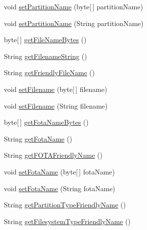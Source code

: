 \begin{DoxyCompactItemize}
void \hyperlink{class_c_a_s_u_a_l_1_1archiving_1_1libpit_1_1_pit_entry_ad8aabdd2d4ed27f78caff057a86463a5}{set\-Partition\-Name} (byte\mbox{[}$\,$\mbox{]} partition\-Name)
\item 
void \hyperlink{class_c_a_s_u_a_l_1_1archiving_1_1libpit_1_1_pit_entry_ae11c9323f73814e25d10d9ef29de25ba}{set\-Partition\-Name} (String partition\-Name)
\item 
byte\mbox{[}$\,$\mbox{]} \hyperlink{class_c_a_s_u_a_l_1_1archiving_1_1libpit_1_1_pit_entry_ae4ba59c5a04f97e8e01e8fc6fd021b3c}{get\-File\-Name\-Bytes} ()
\item 
String \hyperlink{class_c_a_s_u_a_l_1_1archiving_1_1libpit_1_1_pit_entry_a2bb32a410751336bded2da8c98bcf439}{get\-Filename\-String} ()
\item 
String \hyperlink{class_c_a_s_u_a_l_1_1archiving_1_1libpit_1_1_pit_entry_aa5a661ba922a600a35c1037cc96cf460}{get\-Friendly\-File\-Name} ()
\item 
void \hyperlink{class_c_a_s_u_a_l_1_1archiving_1_1libpit_1_1_pit_entry_a020e3354fd26273533473c2bc391e846}{set\-Filename} (byte\mbox{[}$\,$\mbox{]} filename)
\item 
void \hyperlink{class_c_a_s_u_a_l_1_1archiving_1_1libpit_1_1_pit_entry_a816462a2e0544f057a118ffc4ec9f80d}{set\-Filename} (String filename)
\item 
byte\mbox{[}$\,$\mbox{]} \hyperlink{class_c_a_s_u_a_l_1_1archiving_1_1libpit_1_1_pit_entry_acd4c00ebcc7dec9ab0564563f9cdbede}{get\-Fota\-Name\-Bytes} ()
\item 
String \hyperlink{class_c_a_s_u_a_l_1_1archiving_1_1libpit_1_1_pit_entry_abd622d9204bd1e46db2b205b016a2726}{get\-Fota\-Name} ()
\item 
String \hyperlink{class_c_a_s_u_a_l_1_1archiving_1_1libpit_1_1_pit_entry_ad5fe07455a5e697fb7a22eb4de662c11}{get\-F\-O\-T\-A\-Friendly\-Name} ()
\item 
void \hyperlink{class_c_a_s_u_a_l_1_1archiving_1_1libpit_1_1_pit_entry_a0fc527ed85e5240bc005c91216ea39bb}{set\-Fota\-Name} (byte\mbox{[}$\,$\mbox{]} fota\-Name)
\item 
void \hyperlink{class_c_a_s_u_a_l_1_1archiving_1_1libpit_1_1_pit_entry_a2ccf03dfe67e6534bf8ffa80799aa55e}{set\-Fota\-Name} (String fota\-Name)
\item 
String \hyperlink{class_c_a_s_u_a_l_1_1archiving_1_1libpit_1_1_pit_entry_ab5b074367aa08d5f550112c9391dd83e}{get\-Partition\-Type\-Friendly\-Name} ()
\item 
String \hyperlink{class_c_a_s_u_a_l_1_1archiving_1_1libpit_1_1_pit_entry_adb21af84eb8c643ff7fdef92c9d95c12}{get\-Filesystem\-Type\-Friendly\-Name} ()

\end{DoxyCompactItemize}
